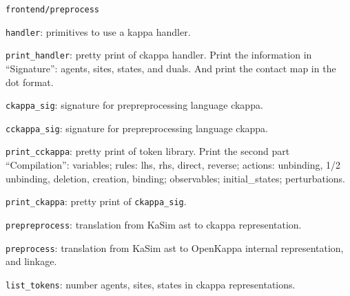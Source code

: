 \documentclass{article}
\begin{document}
\begin{e}
\item \verb|frontend/preprocess|
\begin{i}
\item \verb|handler|: primitives to use a kappa handler.
\item \verb|print_handler|: pretty print of ckappa handler. Print the
  information in ``Signature'': agents, sites, states, and duals. And print
  the contact map in the dot format.
\item \verb|ckappa_sig|: signature for prepreprocessing language ckappa.
\item \verb|cckappa_sig|: signature for prepreprocessing language ckappa.
\item \verb|print_cckappa|: pretty print of token library. Print the second
  part ``Compilation'': variables; rules: lhs, rhs, direct, reverse;
  actions: unbinding, 1/2 unbinding, deletion, creation, binding;
  observables; initial\_states; perturbations.
\item \verb|print_ckappa|: pretty print of \verb|ckappa_sig|.

\item \verb|prepreprocess|: translation from KaSim ast to ckappa
  representation.
\item \verb|preprocess|: translation from KaSim ast to OpenKappa internal
  representation, and linkage.
\item \verb|list_tokens|: number agents, sites, states in ckappa
  representations.
\end{i}

\end{e}
\end{document}
